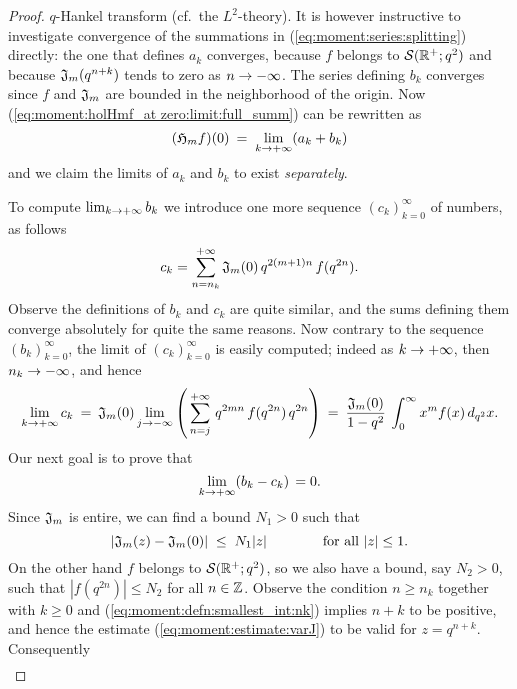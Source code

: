 \begin{proof}
$q$-Hankel transform (cf.\ the $L^2$-theory). It is however instructive
to investigate convergence of the summations in (\ref{eq:moment:series:splitting})
directly: the one that defines $a_k$ converges, because $f$ belongs to ${\mathcal S}(\mathbb{R}^+;q^2)$
and because $\mathfrak{J}_{m}(q^{n+k})$ tends to zero as $n \rightarrow -\infty$. The
series defining $b_k$ converges since $f$ and $\mathfrak{J}_{m}$ are
bounded in the neighborhood of the origin.
Now (\ref{eq:moment:holHmf_at zero:limit:full_summ}) can be rewritten as
\begin{equation}\label{eq:moment:lim:ak+bk}
   (\mathfrak{H}_{m}f)(0) \:=\; \lim_{k \rightarrow +\infty} (a_k + b_k)
\end{equation}
and we claim the limits of $a_k$ and $b_k$ to exist {\em separately}.

To compute $\lim_{k \rightarrow +\infty} b_k$ we introduce one more
sequence $(c_k)_{k=0}^\infty$ of numbers, as follows
$$   c_k = \sum_{n=n_k}^{+\infty}  \mathfrak{J}_{m}(0) \, q^{2(m+1)n}\, f(q^{2n}). $$
Observe the definitions of $b_k$ and $c_k$ are quite similar,
and the sums defining them converge absolutely for quite the same reasons.
Now contrary to the sequence $(b_k)_{k=0}^\infty$,
the limit of $(c_k)_{k=0}^\infty$ is easily computed; indeed as $k \rightarrow +\infty$,
then $n_k \rightarrow -\infty$, and hence
\begin{equation}\label{eq:moment:limit:ck}
 \lim_{k \rightarrow +\infty} c_k
     \:= \:  \mathfrak{J}_{m}(0)  \lim_{j \rightarrow -\infty}
             \left(\, \sum_{n=j}^{+\infty} \, q^{2mn}\, f(q^{2n}) \, q^{2n}\right)
     \:= \:  \frac{\mathfrak{J}_{m}(0)}{1-q^2} \: \int_0^\infty x^m f(x)\, d_{q^2}x.
\end{equation}
Our next goal is to prove that
\begin{equation}\label{eq:moment:lim:bk-ck:zero}
  \lim_{k \rightarrow +\infty} (b_k - c_k) \, = 0.
\end{equation}
Since $\mathfrak{J}_{m}$ is entire, we can find a bound $N_1>0$ such that
\begin{equation}\label{eq:moment:estimate:varJ}
  |\mathfrak{J}_{m}(z) - \mathfrak{J}_{m}(0)| \; \leq  \; N_1 |z|  \hspace{4em}  \mbox{for all $|z| \leq 1$.}
\end{equation}
On the other hand $f$ belongs to ${\mathcal S}(\mathbb{R}^+;q^2)$, so we also have a bound,
say $N_2>0$, such that $|f(q^{2n})| \leq N_2$ for all $n\in \mathbb{Z}$.
Observe the condition $n\geq n_k$ together with $k\geq 0$ and (\ref{eq:moment:defn:smallest_int:nk})
implies $n+k$ to be positive, and hence the estimate (\ref{eq:moment:estimate:varJ})
to be valid for $z=q^{n+k}$. Consequently
\begin{eqnarray*}

\end{eqnarray*}
\end{proof}
